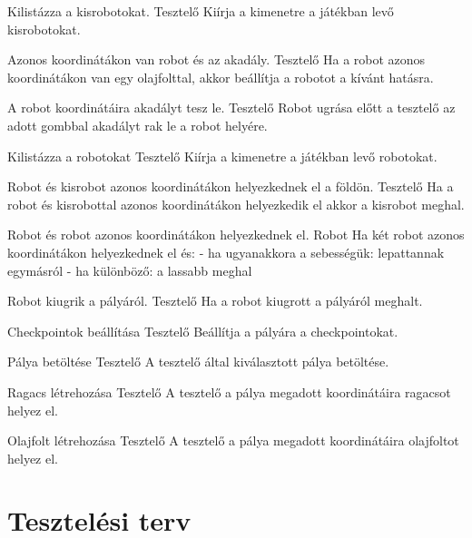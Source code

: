{Kilistázza a kisrobotokat.}
{Tesztelő}
{Kiírja a kimenetre a játékban levő kisrobotokat.}

{Azonos koordinátákon van robot és az akadály.}
{Tesztelő}
{Ha a robot azonos koordinátákon van egy olajfolttal, akkor beállítja a robotot a kívánt hatásra.}

{A robot koordinátáira akadályt tesz le.}
{Tesztelő}
{Robot ugrása előtt a tesztelő az adott gombbal akadályt rak le a robot helyére.}

{Kilistázza a robotokat}
{Tesztelő}
{Kiírja a kimenetre a játékban levő robotokat.}

{Robot és kisrobot azonos koordinátákon helyezkednek el a földön.}
{Tesztelő}
{Ha a robot és kisrobottal azonos koordinátákon helyezkedik el akkor a kisrobot meghal.}

{Robot és robot azonos koordinátákon helyezkednek el.}
{Robot}
{Ha két robot azonos koordinátákon helyezkednek el és:  
- ha ugyanakkora a sebességük: lepattannak egymásról
- ha különböző: a lassabb meghal
}

{Robot kiugrik a pályáról.}
{Tesztelő}
{Ha a robot kiugrott a pályáról meghalt.}

{Checkpointok beállítása}
{Tesztelő}
{Beállítja a pályára a checkpointokat.}

{Pálya betöltése}
{Tesztelő}
{A tesztelő által kiválasztott pálya betöltése.}

{Ragacs létrehozása}
{Tesztelő}
{A tesztelő a pálya megadott koordinátáira ragacsot helyez el.}

{Olajfolt létrehozása}
{Tesztelő}
{A tesztelő a pálya megadott koordinátáira olajfoltot helyez el.}




\section{Tesztelési terv}

